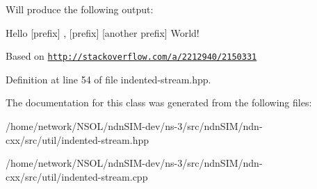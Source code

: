 Will produce the following output\+: \begin{DoxyVerb}Hello
 [prefix] ,
 [prefix] [another prefix] World!
\end{DoxyVerb}


Based on \href{http://stackoverflow.com/a/2212940/2150331}{\tt http\+://stackoverflow.\+com/a/2212940/2150331} 

Definition at line 54 of file indented-\/stream.\+hpp.



The documentation for this class was generated from the following files\+:\begin{DoxyCompactItemize}
\item 
/home/network/\+N\+S\+O\+L/ndn\+S\+I\+M-\/dev/ns-\/3/src/ndn\+S\+I\+M/ndn-\/cxx/src/util/indented-\/stream.\+hpp\item 
/home/network/\+N\+S\+O\+L/ndn\+S\+I\+M-\/dev/ns-\/3/src/ndn\+S\+I\+M/ndn-\/cxx/src/util/indented-\/stream.\+cpp\end{DoxyCompactItemize}
